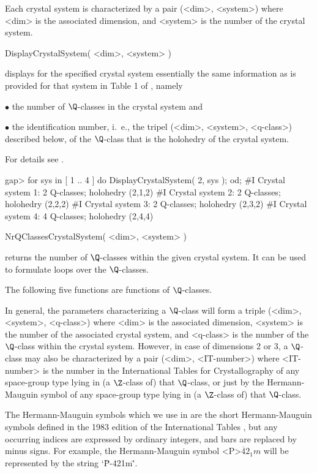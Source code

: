 Each crystal system is characterized by a pair (<dim>, <system>) where
<dim>  is the associated dimension,  and  <system> is  the number of  the
crystal system.

\>DisplayCrystalSystem( <dim>, <system> )

displays for the specified crystal system essentially the same
information as is provided for that system in Table 1 of
\cite{BBNWZ78}, namely

\beginlist
\item{$\bullet$} 
    the number of $\Q$-classes in the crystal system and
\item{$\bullet$} 
    the identification number, i.~e., the tripel (<dim>, <system>,
    <q-class>) described below, of the $\Q$-class that is the 
    holohedry of the crystal system.  
\endlist

For details see \cite{BBNWZ78}.

\beginexample
gap> for sys in [ 1 .. 4 ] do  DisplayCrystalSystem( 2, sys );  od;
#I  Crystal system 1: 2 Q-classes; holohedry (2,1,2)
#I  Crystal system 2: 2 Q-classes; holohedry (2,2,2)
#I  Crystal system 3: 2 Q-classes; holohedry (2,3,2)
#I  Crystal system 4: 4 Q-classes; holohedry (2,4,4)
\endexample


\>NrQClassesCrystalSystem( <dim>, <system> )

returns the number of $\Q$-classes within the given crystal system.
It can be used to formulate loops over the $\Q$-classes.

The following five functions are functions of $\Q$-classes.

In general, the parameters characterizing a $\Q$-class will form a
triple (<dim>, <system>, <q-class>) where <dim> is the associated
dimension, <system> is the number of the associated crystal system,
and <q-class> is the number of the $\Q$-class within the crystal
system.  However, in case of dimensions 2 or 3, a $\Q$-class may also
be characterized by a pair (<dim>, <IT-number>) where <IT-number> is
the number in the International Tables for Crystallography
\cite{Hah95} of any space-group type lying in (a $\Z$-class of) that
$\Q$-class, or just by the Hermann-Mauguin symbol of any space-group
type lying in (a $\Z$-class of) that $\Q$-class.

The Hermann-Mauguin symbols  which we
use in {\GAP} are the short Hermann-Mauguin symbols defined in the
1983 edition of the International Tables \cite{Hah95}, but any
occurring indices are expressed by ordinary integers, and bars are
replaced by minus signs.  For example, the Hermann-Mauguin symbol
<P>$\overline{4}2_1m$ will be represented by the string `\"P-421m\"'.

